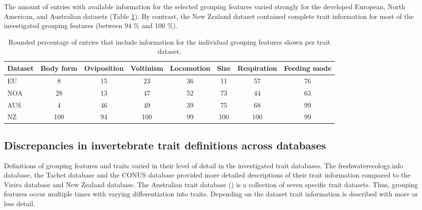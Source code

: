 \documentclass{article}
\begin{document}
The amount of entries with available information for the selected grouping features varied strongly for the developed European, North American, and Australian datasets (Table \ref{tab:trait_coverage}). By contrast, the New Zealand dataset contained complete trait information for most of the investigated grouping features (between 94 \% and 100 \%).

\begin{table}[ht]
    \centering
    \caption{Rounded percentage of entries that include 
    information for the individual grouping features
    shown per trait dataset.} 
    \label{tab:trait_coverage}
    \begin{tabular}{lccccccc}
    \toprule[.1em]
    Dataset & Body form & Oviposition & Voltinism & Locomotion & Size & Respiration & Feeding mode \\ 
    \toprule[.1em]
    EU & 8 & 15 & 23 & 36 & 11 & 57 & 76 \\ 
    NOA & 28 & 13 & 47 & 52 & 73 & 44 & 63 \\ 
    AUS & 4 & 46 & 49 & 39 & 75 & 68 & 99 \\ 
    NZ & 100 & 94 & 100 & 99 & 100 & 100 & 99 \\ 
    \bottomrule
    \end{tabular}
\end{table}

\newpage


\subsection*{Discrepancies in invertebrate trait definitions across databases}

Definitions of grouping features and traits varied in their level of detail in the investigated trait databases. The freshwaterecology.info database, the Tachet database and the CONUS database provided more detailed descriptions of their trait information compared to the Vieira database and New Zealand database. The Australian trait database (\cite{kefford_integrated_2020}) is a collection of seven specific trait datasets. Thus, grouping features occur multiple times with varying differentiation into traits. Depending on the dataset trait information is described with more or less detail.
\end{document}

